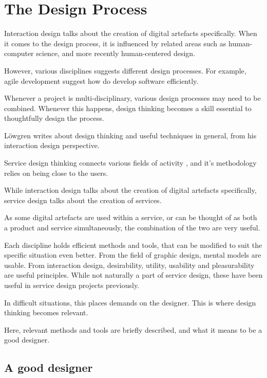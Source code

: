 \section{The Design Process}

%

Interaction design talks about the creation of digital artefacts specifically. When it comes to the design process, it is influenced by related areas such as human-computer science, and more recently human-centered design.

However, various disciplines suggests different design processes. For example, agile development suggest how do develop software efficiently.

Whenever a project is multi-disciplinary, various design processes may need to be combined. Whenever this happens, design thinking becomes a skill essential to thoughtfully design the process.

Löwgren \cite{lowgren} writes about design thinking and useful techniques in general, from his interaction design perspective.

Service design thinking connects various fields of activity \cite{stickdorn}, and it's methodology relies on being close to the users.

While interaction design talks about the creation of digital artefacts specifically, service design talks about the creation of services.

As some digital artefacts are used within a service, or can be thought of as both a product and service simultaneously, the combination of the two are very useful.

Each discipline holds efficient methods and tools, that can be modified to suit the specific situation even better. From the field of graphic design, mental models are usable. From interaction design, desirability, utility, usability and pleasurability are useful principles. While not naturally a part of service design, these have been useful in service design projects previously. \cite{stickdorn}

In difficult situations, this places demands on the designer. This is where design thinking becomes relevant.

Here, relevant methods and tools are briefly described, and what it means to be a good designer.

\subsection{A good designer}


